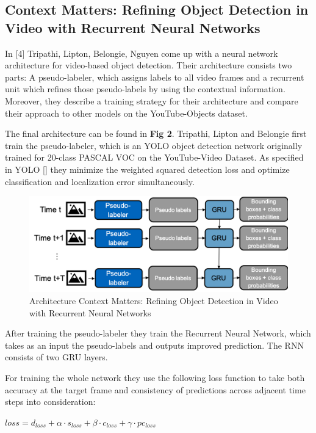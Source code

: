 \documentclass[conference]{IEEEtran}
\begin{document}
\subsection{Context Matters: Refining Object Detection in Video with Recurrent Neural Networks}
In [4] Tripathi, Lipton, Belongie, Nguyen come up with a neural network architecture for video-based object detection. Their architecture consists two parts: A pseudo-labeler, which assigns labels to all video frames and a recurrent unit which refines those pseudo-labels by using the contextual information. Moreover, they describe a training strategy for their architecture and compare their approach to other models on the YouTube-Objects dataset. \newline

The final architecture can be found in \textbf{Fig 2}. Tripathi, Lipton and Belongie first train the pseudo-labeler, which is an YOLO object detection network originally trained for 20-class PASCAL VOC on the YouTube-Video Dataset. As specified in YOLO [] they minimize the weighted squared detection loss and optimize classification and localization error simultaneously. 

\begin{figure} [h]
\includegraphics[width=\columnwidth]{ContextMatters}
\caption{Architecture Context Matters: Refining Object Detection in Video with Recurrent Neural Networks}
\end{figure}

After training the pseudo-labeler they train the Recurrent Neural Network, which takes as an input the pseudo-labels and outputs improved prediction. The RNN consists of two GRU layers. \newline

For training the whole network they use the following loss function to take both accuracy at the target frame and consistency of predictions across adjacent time steps into consideration: \newline

$ loss = d_{loss} + \alpha \cdot s_{loss} + \beta \cdot c_{loss} + \gamma \cdot pc_{loss} $ \newline
\end{document}
